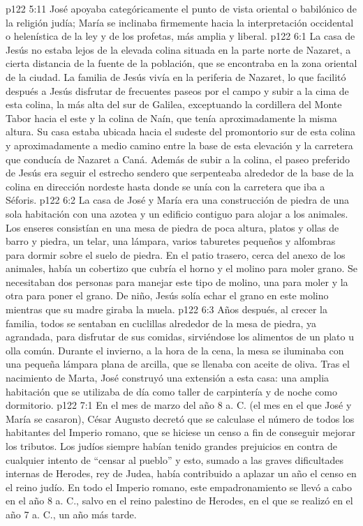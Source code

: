 \vs p122 5:11 José apoyaba categóricamente el punto de vista oriental o babilónico de la religión judía; María se inclinaba firmemente hacia la interpretación occidental o helenística de la ley y de los profetas, más amplia y liberal.
\vs p122 6:1 La casa de Jesús no estaba lejos de la elevada colina situada en la parte norte de Nazaret, a cierta distancia de la fuente de la población, que se encontraba en la zona oriental de la ciudad. La familia de Jesús vivía en la periferia de Nazaret, lo que facilitó después a Jesús disfrutar de frecuentes paseos por el campo y subir a la cima de esta colina, la más alta del sur de Galilea, exceptuando la cordillera del Monte Tabor hacia el este y la colina de Naín, que tenía aproximadamente la misma altura. Su casa estaba ubicada hacia el sudeste del promontorio sur de esta colina y aproximadamente a medio camino entre la base de esta elevación y la carretera que conducía de Nazaret a Caná. Además de subir a la colina, el paseo preferido de Jesús era seguir el estrecho sendero que serpenteaba alrededor de la base de la colina en dirección nordeste hasta donde se unía con la carretera que iba a Séforis.
\vs p122 6:2 La casa de José y María era una construcción de piedra de una sola habitación con una azotea y un edificio contiguo para alojar a los animales. Los enseres consistían en una mesa de piedra de poca altura, platos y ollas de barro y piedra, un telar, una lámpara, varios taburetes pequeños y alfombras para dormir sobre el suelo de piedra. En el patio trasero, cerca del anexo de los animales, había un cobertizo que cubría el horno y el molino para moler grano. Se necesitaban dos personas para manejar este tipo de molino, una para moler y la otra para poner el grano. De niño, Jesús solía echar el grano en este molino mientras que su madre giraba la muela.
\vs p122 6:3 Años después, al crecer la familia, todos se sentaban en cuclillas alrededor de la mesa de piedra, ya agrandada, para disfrutar de sus comidas, sirviéndose los alimentos de un plato u olla común. Durante el invierno, a la hora de la cena, la mesa se iluminaba con una pequeña lámpara plana de arcilla, que se llenaba con aceite de oliva. Tras el nacimiento de Marta, José construyó una extensión a esta casa: una amplia habitación que se utilizaba de día como taller de carpintería y de noche como dormitorio.
\vs p122 7:1 En el mes de marzo del año 8 a. C. (el mes en el que José y María se casaron), César Augusto decretó que se calculase el número de todos los habitantes del Imperio romano, que se hiciese un censo a fin de conseguir mejorar los tributos. Los judíos siempre habían tenido grandes prejuicios en contra de cualquier intento de “censar al pueblo” y esto, sumado a las graves dificultades internas de Herodes, rey de Judea, había contribuido a aplazar un año el censo en el reino judío. En todo el Imperio romano, este empadronamiento se llevó a cabo en el año 8 a. C., salvo en el reino palestino de Herodes, en el que se realizó en el año 7 a. C., un año más tarde.

